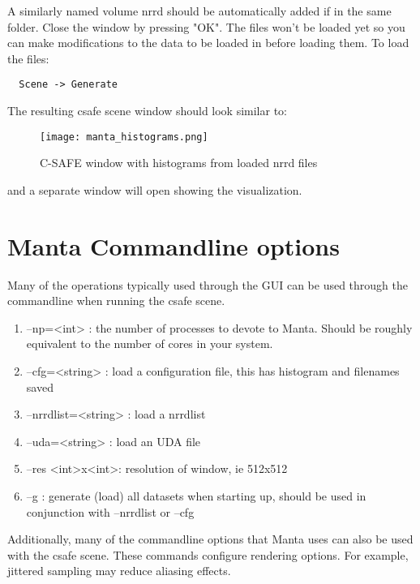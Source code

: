 A similarly named volume nrrd should be automatically added if in the same folder.  Close the window by pressing "OK".  The files won't be loaded yet so you can make modifications to the data to be loaded in before loading them.  To load the files:

\begin{Verbatim}
  Scene -> Generate
\end{Verbatim}

The resulting csafe scene window should look similar to:

\begin{figure}[htbp]
  \center
  \texttt{[image: manta\_histograms.png]}
  \caption{C-SAFE window with histograms from loaded nrrd files}
  \label{fig:manta_histograms}
\end{figure}

and a separate window will open showing the visualization. 

\section{Manta Commandline options} 
Many of the operations typically used through the GUI can be used through the commandline when running the csafe scene.

\begin{enumerate}

\item
--np=<int>  : the number of processes to devote to Manta. Should be roughly equivalent to the number of cores in your system.
\item
--cfg=<string>  : load a configuration file, this has histogram and filenames saved
\item
--nrrdlist=<string>  : load a nrrdlist
\item
--uda=<string>  : load an UDA file
\item
--res <int>x<int>: resolution of window, ie 512x512
\item
--g  : generate (load) all datasets when starting up, should be used in conjunction with --nrrdlist or --cfg

\end{enumerate}

Additionally, many of the commandline options that Manta uses can also be used with the csafe scene.  These commands configure rendering options.  For example, jittered sampling may reduce aliasing effects.

